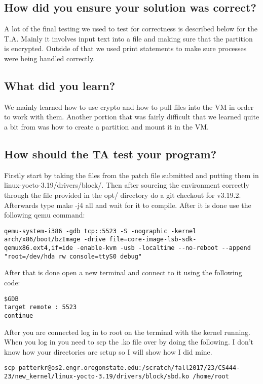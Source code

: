 \documentclass[10pt,letterpaper,onecolumn,draftclsnofoot]{IEEEtran}
\begin{document}
\subsection{How did you ensure your solution was correct?}
A lot of the final testing we used to test for correctness is described below for the T.A. Mainly it involves input text into a file and making sure that the partition is encrypted. Outside of that we used print statements to make sure processes were being handled correctly.

\subsection{What did you learn?}
We mainly learned how to use crypto and how to pull files into the VM in order to work with them. Another portion that was fairly difficult that we learned quite a bit from was how to create a partition and mount it in the VM.

\subsection{How should the TA test your program?}
Firstly start by taking the files from the patch file submitted and putting them in linux-yocto-3.19/drivers/block/.
Then after sourcing the environment correctly through the file provided in the opt/ directory do a git checkout for v3.19.2.
Afterwards type make -j4 all and wait for it to compile. After it is done use the following qemu command:

\begin{lstlisting}
qemu-system-i386 -gdb tcp::5523 -S -nographic -kernel arch/x86/boot/bzImage -drive file=core-image-lsb-sdk-qemux86.ext4,if=ide -enable-kvm -usb -localtime --no-reboot --append "root=/dev/hda rw console=ttyS0 debug"
\end{lstlisting}

After that is done open a new terminal and connect to it using the following code:

\begin{lstlisting}
$GDB
target remote : 5523
continue
\end{lstlisting}

After you are connected log in to root on the terminal with the kernel running.
When you log in you need to scp the .ko file over by doing the following.
I don't know how your directories are setup so I will show how I did mine.

\begin{lstlisting}
scp patterkr@os2.engr.oregonstate.edu:/scratch/fall2017/23/CS444-23/new_kernel/linux-yocto-3.19/drivers/block/sbd.ko /home/root
\end{lstlisting}
\end{document}
